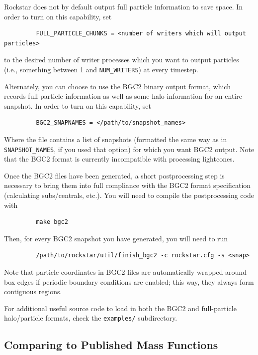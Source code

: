 \documentclass[12pt]{article}
\begin{document}
      Rockstar does not by default output full particle information to
      save space.  In order to turn on this capability, set
\begin{verbatim}
         FULL_PARTICLE_CHUNKS = <number of writers which will output particles>
\end{verbatim}
      to the desired number of writer processes which you want to output
      particles (i.e., something between 1 and \texttt{NUM\_WRITERS}) at every timestep.

      Alternately, you can choose to use the BGC2 binary output format, which
      records full particle information as well as some halo information for
      an entire snapshot.  In order to turn on this capability, set
\begin{verbatim}
         BGC2_SNAPNAMES = </path/to/snapshot_names>
\end{verbatim}
      Where the file contains a list of snapshots (formatted the same way as
      in \texttt{SNAPSHOT\_NAMES}, if you used that option) for which you want BGC2
      output.  Note that the BGC2 format is currently incompatible with processing
      lightcones.

      Once the BGC2 files have been generated, a short postprocessing step
      is necessary to bring them into full compliance with the BGC2 format specification (calculating
      subs/centrals, etc.).  You will need to compile the postprocessing
      code with
\begin{verbatim}
         make bgc2
\end{verbatim}
      Then, for every BGC2 snapshot you have generated, you will need to run
\begin{verbatim}
         /path/to/rockstar/util/finish_bgc2 -c rockstar.cfg -s <snap>
\end{verbatim}
      Note that particle coordinates in BGC2 files are automatically wrapped around
      box edges if periodic boundary conditions are enabled; this way, they
      always form contiguous regions.

      For additional useful source code to load in both the BGC2 and
      full-particle halo/particle formats, check the \texttt{examples/} subdirectory.

\subsection{Comparing to Published Mass Functions}
\end{document}
